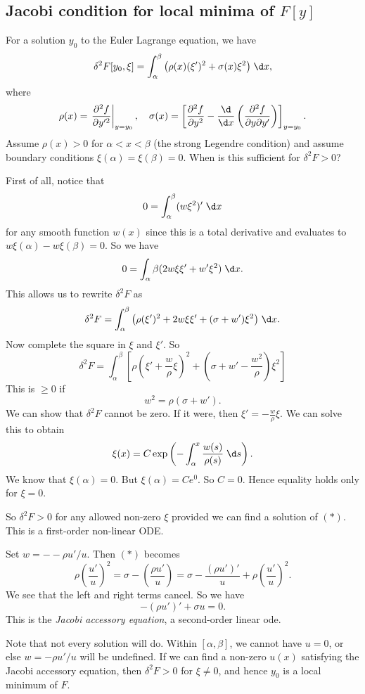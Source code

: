 \documentclass[a4paper]{article}
\begin{document}
\subsection{Jacobi condition for local minima of \texorpdfstring{$F[y]$}{F[y]}}
For a solution $y_0$ to the Euler Lagrange equation, we have
\[
  \delta^2 F[y_0, \xi] = \int_\alpha^\beta \big(\rho(x) (\xi')^2 + \sigma(x) \xi^2\big)\;\d x,
\]
where
\[
  \rho(x) = \left.\frac{\partial^2 f}{\partial y'^2}\right|_{y = y_0},\quad
  \sigma(x) = \left[\frac{\partial^2 f}{\partial y^2} - \frac{\d}{\d x}\left(\frac{\partial^2 f}{\partial y \partial y'}\right)\right]_{y = y_0}.
\]
Assume $\rho(x) > 0$ for $\alpha < x < \beta$ (the strong Legendre condition) and assume boundary conditions $\xi(\alpha) = \xi(\beta) = 0$. When is this sufficient for $\delta^2 F > 0$? 

First of all, notice that
\[
  0 = \int_\alpha^\beta (w\xi^2)' \;\d x
\]
for any smooth function $w(x)$ since this is a total derivative and evaluates to $w\xi(\alpha) - w\xi(\beta) = 0$. So we have
\[
  0 = \int_\alpha\beta (2w\xi \xi' + w'\xi^2)\;\d x.
\]
This allows us to rewrite $\delta^2 F$ as
\[
  \delta^2 F = \int_\alpha^\beta \big(\rho (\xi')^2 + 2w\xi \xi' + (\sigma + w')\xi^2\big)\;\d x.
\]
Now complete the square in $\xi$ and $\xi'$. So
\[
  \delta^2 F = \int_\alpha^\beta \left[\rho\left(\xi' + \frac{w}{\rho} \xi\right)^2 +\left(\sigma + w' - \frac{w^2}{\rho}\right)\xi^2 \right]
\]
This is $\geq 0$ if
\[
  w^2 = \rho(\sigma + w').\tag{$*$}
\]
We can show that $\delta^2 F$ cannot be zero. If it were, then $\xi' = -\frac{w}{\rho}\xi$. We can solve this to obtain
\[
  \xi(x) = C\exp\left(-\int_\alpha^x \frac{w(s)}{\rho(s)}\;\d s\right).
\]
We know that $\xi(\alpha) = 0$. But $\xi(\alpha) = C e^0$. So $C = 0$. Hence equality holds only for $\xi = 0$.

So $\delta^2 F > 0$ for any allowed non-zero $\xi$ provided we can find a solution of $(*)$. This is a first-order non-linear ODE.

Set $w = --\rho u'/u$. Then $(*)$ becomes
\[
  \rho\left(\frac{u'}{u}\right)^2 = \sigma - \left(\frac{\rho u'}{u}\right) = \sigma - \frac{(\rho u')'}{u} + \rho \left(\frac{u'}{u}\right)^2.
\]
We see that the left and right terms cancel. So we have
\[
  -(\rho u')' + \sigma u = 0.
\]
This is the \emph{Jacobi accessory equation}, a second-order linear ode.

Note that not every solution will do. Within $[\alpha, \beta]$, we cannot have $u = 0$, or else $w = -\rho u'/u$ will be undefined. If we can find a non-zero $u(x)$ satisfying the Jacobi accessory equation, then $\delta^2 F > 0$ for $\xi \not= 0$, and hence $y_0$ is a local minimum of $F$.
\end{document}

